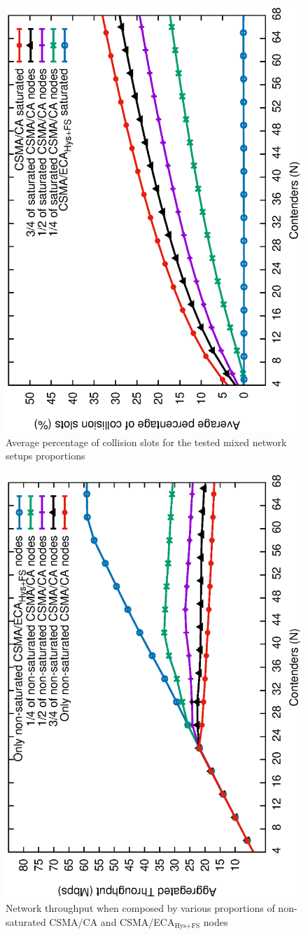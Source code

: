 	\begin{figure}[tb]
		\centering
		\includegraphics[width=0.7\linewidth,angle=-90]{figures/saturated/mixed/collisions-mixed/collisions-mixed-saturated-TON.eps}
		\caption{Average percentage of collision slots for the tested mixed network setups proportions}
		\label{fig:mixedCollisions-sat}
	\end{figure}
	
	\begin{figure}[tb]
		\centering
		\includegraphics[width=0.7\linewidth,angle=-90]{figures/unsaturated/mixed/throughput-mixed/throughput-unsaturated-mixed-TON.eps}
		\caption{Network throughput when composed by various proportions of non-saturated CSMA/CA and CSMA/ECA$_{\text{Hys+FS}}$ nodes}
		\label{fig:mixedThroughput-unsat}
	\end{figure}
	
